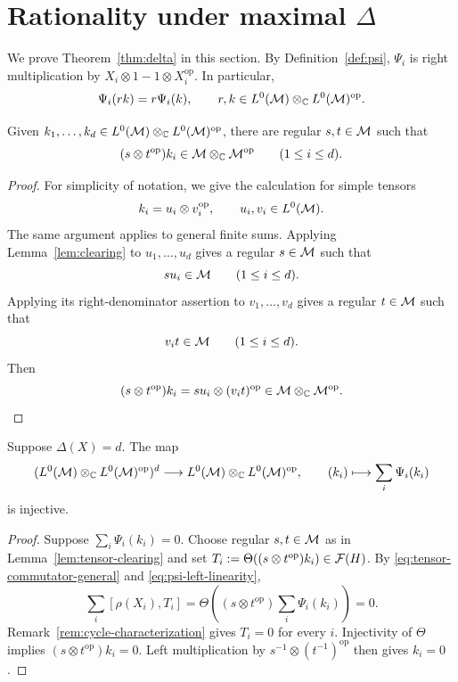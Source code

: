 \section{Rationality under maximal \texorpdfstring{$\Delta$}{Delta}}\label{sec:maximal-delta}

We prove Theorem~\ref{thm:delta} in this section.
By Definition~\ref{def:psi}, $\Psi_i$ is right multiplication by $X_i\otimes1-1\otimes X_i^{\mathrm{op}}$.
In particular,
\begin{equation}\label{eq:psi-left-linearity}
 \Psi_i(rk)=r\Psi_i(k),\qquad
 r,k\in L^0(\mathcal M)\otimes_{\mathbb C}L^0(\mathcal M)^{\mathrm{op}}.
\end{equation}

\begin{lemma}\label{lem:tensor-clearing}
Given $k_1,\ldots,k_d\in L^0(\mathcal M)\otimes_{\mathbb C}L^0(\mathcal M)^{\mathrm{op}}$, there are regular $s,t\in\mathcal M$ such that
\[
 (s\otimes t^{\mathrm{op}})k_i
 \in\mathcal M\otimes_{\mathbb C}\mathcal M^{\mathrm{op}}\qquad(1\leq i\leq d).
\]
\end{lemma}
\begin{proof}
For simplicity of notation, we give the calculation for simple tensors
\[
 k_i=u_i\otimes v_i^{\mathrm{op}},\qquad u_i,v_i\in L^0(\mathcal M).
\]
The same argument applies to general finite sums.
Applying Lemma~\ref{lem:clearing} to $u_1,\ldots,u_d$ gives a regular $s\in\mathcal M$ such that
\[
 su_i\in\mathcal M\qquad(1\leq i\leq d).
\]
Applying its right-denominator assertion to $v_1,\ldots,v_d$ gives a regular $t\in\mathcal M$ such that
\[
 v_it\in\mathcal M\qquad(1\leq i\leq d).
\]
Then
\[
 (s\otimes t^{\mathrm{op}})k_i
 =su_i\otimes(v_it)^{\mathrm{op}}
 \in\mathcal M\otimes_{\mathbb C}\mathcal M^{\mathrm{op}}.
\]
\end{proof}

\begin{lemma}\label{lem:tensor-injectivity}
Suppose $\Delta(X)=d$.
The map
\[
 (L^0(\mathcal M)\otimes_{\mathbb C}L^0(\mathcal M)^{\mathrm{op}})^d\longrightarrow
 L^0(\mathcal M)\otimes_{\mathbb C}L^0(\mathcal M)^{\mathrm{op}},\qquad
 (k_i)\longmapsto\sum_i\Psi_i(k_i)
\]
is injective.
\end{lemma}
\begin{proof}
Suppose $\sum_i\Psi_i(k_i)=0$.
Choose regular $s,t\in\mathcal M$ as in Lemma~\ref{lem:tensor-clearing} and set $T_i:=\Theta((s\otimes t^{\mathrm{op}})k_i)\in\mathcal F(H)$.
By \eqref{eq:tensor-commutator-general} and \eqref{eq:psi-left-linearity},
\[
 \sum_i[\rho(X_i),T_i]
 =\Theta\left((s\otimes t^{\mathrm{op}})\sum_i\Psi_i(k_i)\right)=0.
\]
Remark~\ref{rem:cycle-characterization} gives $T_i=0$ for every $i$.
Injectivity of $\Theta$ implies $(s\otimes t^{\mathrm{op}})k_i=0$.
Left multiplication by $s^{-1}\otimes(t^{-1})^{\mathrm{op}}$ then gives $k_i=0$.
\end{proof}

